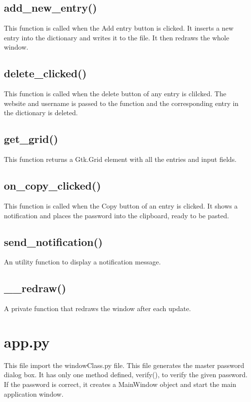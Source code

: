\documentclass[10pt,a4paper,titlepage]{report}
\begin{document}
\subsection{add\_new\_entry()}
\newline\par This function is called when the Add entry button is clicked. It inserts a new entry into the dictionary and writes it to the file. It then redraws the whole window. 
\subsection{delete\_clicked()}
\newline\par This function is called when the delete button of any entry is clilcked. The website and username is passed to the function and the corresponding entry in the dictionary is deleted.
\subsection{get\_grid()}
\newline\par This function returns a Gtk.Grid element with all the entries and input fields. 
\subsection{on\_copy\_clicked()}
\newline\par This function is called when the Copy button of an entry is clicked. It shows a notification and places the password into the clipboard, ready to be pasted.
\subsection{send\_notification()}
\newline\par An utility function to display a notification message.
\subsection{\_\_redraw()}
\newline\par A private function that redraws the window after each update. 

\section{app.py}
\newline\par This file import the windowClass.py file. This file generates the master password dialog box. It has only one method defined, verify(), to verify the given password. If the password is correct, it creates a MainWindow object and start the main application window. 
\end{document}
